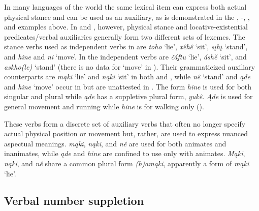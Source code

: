 \documentclass[output=paper]{LSP/langsci}
\begin{document}
In many languages of the world the same lexical item can express both actual physical stance and can be used as an auxiliary, as is demonstrated in the , -, , and  examples above. In  and , however, physical stance and locative-existential predicates/verbal auxiliaries generally form two different sets of lexemes. The stance verbs used as independent verbs in  are \emph{toho} `lie', \emph{xêhê} `sit', \emph{sįhį} `stand', and \emph{hine} and \emph{ni} `move'. In  the independent verbs are \emph{čáftu} `lie', \emph{áshĕ} `sit', and \emph{askho(le)} `stand' (there is no data for `move' in ). Their grammaticized auxiliary counterparts are \emph{mąki} `lie' and \emph{nąki} `sit' in both  and , while \emph{nê} `stand' and \emph{ąde} and \emph{hine} `move' occur in  but are unattested in . The  form \emph{hine} is used for both singular and plural while \emph{ąde} has a suppletive plural form, \emph{yukê}. \emph{Ąde} is used for general movement and running while \emph{hine} is for walking only (\citealt[3]{Kaufman2013}). 

These verbs form a discrete set of auxiliary verbs that often no longer specify actual physical position or movement but, rather, are used to express nuanced aspectual meanings.  \emph{mąki}, \emph{nąki}, and \emph{nê} are used for both animates and inanimates, while \emph{ąde} and \emph{hine} are confined to use only with animates. \emph{Mąki}, \emph{nąki}, and \emph{nê} share a common plural form \emph{(h)amąki}, apparently a form of \emph{mąki} `lie'. 
 
\subsection{Verbal number suppletion}
\end{document}
